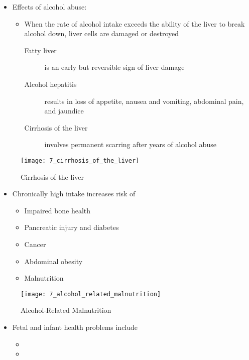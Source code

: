 \documentclass[title={Chapter 7}]{fdsn201notes}
\begin{document}
\begin{itemize}
	\item Effects of alcohol abuse:
	\begin{itemize}
		\item When the rate of alcohol intake exceeds the ability of the liver to break alcohol down, liver cells are damaged or destroyed
		\begin{description}
			\item[Fatty liver] is an early but reversible sign of liver damage
			\item[Alcohol hepatitis] results in loss of appetite, nausea and vomiting, abdominal pain, and jaundice
			\item[Cirrhosis of the liver] involves permanent scarring after years of alcohol abuse
		\end{description}
	\end{itemize}
\end{itemize}

\begin{figure}[H]
	\centering
	\texttt{[image: 7\_cirrhosis\_of\_the\_liver]}
	\caption{Cirrhosis of the liver}
	\label{fig:cirrhosis_of_the_liver}
\end{figure}

\begin{itemize}
	\item Chronically high intake increases risk of
	\begin{itemize}
		\item Impaired bone health
		\item Pancreatic injury and diabetes
		\item Cancer
		\item Abdominal obesity
		\item Malnutrition
	\end{itemize}
\end{itemize}

\begin{figure}[H]
	\centering
	\texttt{[image: 7\_alcohol\_related\_malnutrition]}
	\caption{Alcohol-Related Malnutrition}
	\label{fig:alcohol_related_malnutrition}
\end{figure}

\begin{itemize}
	\item Fetal and infant health problems include
	\begin{itemize}
		\item {}
		\item {}
	\end{itemize}
\end{itemize}
\end{document}
